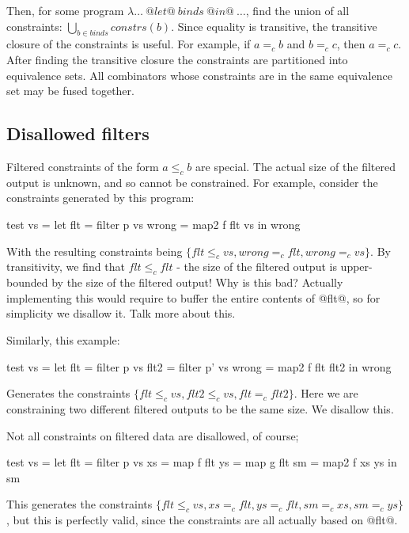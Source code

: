 Then, for some program $\lambda\ldots~@let@~binds~@in@~\ldots$, find the union of all constraints:
$\bigcup_{b \in binds} constrs(b)$.
Since equality is transitive, the transitive closure of the constraints is useful.
For example, if $a =_c b$ and $b =_c c$, then $a =_c c$. 
After finding the transitive closure the constraints are partitioned into equivalence sets.
All combinators whose constraints are in the same equivalence set may be fused together.

\subsection{Disallowed filters}

Filtered constraints of the form $a \le_c b$ are special.
The actual size of the filtered output is unknown, and so cannot be constrained.
For example, consider the constraints generated by this program:
\begin{code}
test vs    =
 let flt   = filter p vs
     wrong = map2   f flt vs
 in  wrong
\end{code}
With the resulting constraints being $\{flt \le_c vs, wrong =_c flt, wrong =_c vs\}$.
By transitivity, we find that $flt \le_c flt$ - the size of the filtered output is upper-bounded by the size of the filtered output! 
Why is this bad?
Actually implementing this would require to buffer the entire contents of @flt@, so for simplicity we disallow it. Talk more about this.   

Similarly, this example:
\begin{code}
test vs    =
 let flt   = filter p  vs
     flt2  = filter p' vs
     wrong = map2   f  flt flt2
 in  wrong
\end{code}
Generates the constraints $\{flt \le_c vs, flt2 \le_c vs, flt =_c flt2\}$.
Here we are constraining two different filtered outputs to be the same size.
We disallow this.

Not all constraints on filtered data are disallowed, of course;
\begin{code}
test vs    =
 let flt   = filter p  vs
     xs    = map    f  flt
     ys    = map    g  flt
     sm    = map2   f  xs ys
 in  sm
\end{code}
This generates the constraints $\{flt \le_c vs, xs =_c flt, ys =_c flt, sm =_c xs, sm =_c ys\}$,
but this is perfectly valid, since the constraints are all actually based on @flt@.

